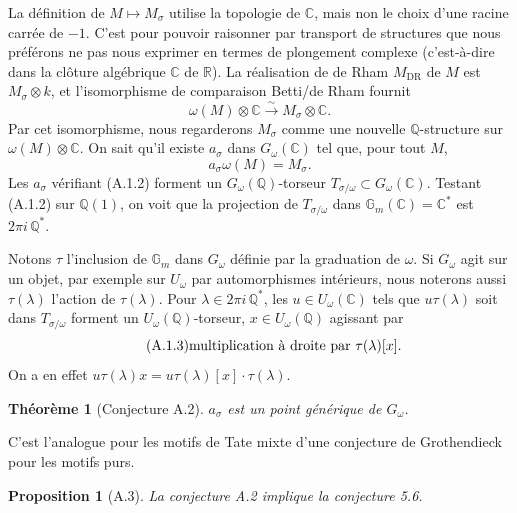 \documentclass[10pt,a4paper]{article}
\newcommand{\Gm}{\mathbb G_m}
\newcommand{\Q}{\mathbb Q}
\newcommand{\C}{\mathbb C}
\newcommand{\R}{\mathbb R}
\theoremstyle{deligne}
\newtheorem*{theorem*}{Théorème}
\newtheorem*{proposition*}{Proposition}
\begin{document}
La définition de \(M\mapsto M_\sigma\) utilise la topologie de \(\C\), mais non le choix d'une racine carrée de \(-1\). C'est pour pouvoir raisonner par transport de structures que nous préférons ne pas nous exprimer en termes de plongement complexe (c'est-à-dire dans la clôture algébrique \(\C\) de \(\R\)). La réalisation de de Rham \(M_{\mathrm{DR}}\) de \(M\) est \(M_\sigma\otimes k\), et l'isomorphisme de comparaison Betti/de Rham fournit
\[
\tag{A.1.1}
\omega(M)\otimes\C\overset{\sim}{\longrightarrow}M_\sigma\otimes\C.
\]
Par cet isomorphisme, nous regarderons \(M_\sigma\) comme une nouvelle \(\Q\)-structure sur \(\omega(M)\otimes\C\). On sait qu'il existe \(a_\sigma\) dans \(G_\omega(\C)\) tel que, pour tout \(M\),
\[
\tag{A.1.2}
a_\sigma\omega(M)=M_\sigma.
\]
Les \(a_\sigma\) vérifiant (A.1.2) forment un \(G_\omega(\Q)\)-torseur \(T_{\sigma/\omega}\subset G_\omega(\C)\). Testant (A.1.2) sur \(\Q(1)\), on voit que la projection de \(T_{\sigma/\omega}\) dans \(\Gm(\C)=\C^*\) est \(2\pi i\,\Q^*\).

Notons \(\tau\) l'inclusion de \(\Gm\) dans \(G_\omega\) définie par la graduation de \(\omega\). Si \(G_\omega\) agit sur un objet, par exemple sur \(U_\omega\) par automorphismes intérieurs, nous noterons aussi \(\tau(\lambda)\) l'action de \(\tau(\lambda)\). Pour \(\lambda\in2\pi i\,\Q^*\), les \(u\in U_\omega(\C)\) tels que \(u\tau(\lambda)\) soit dans \(T_{\sigma/\omega}\) forment un \(U_\omega(\Q)\)-torseur, \(x\in U_\omega(\Q)\) agissant par
\[
\tag{A.1.3}
\hbox{multiplication à droite par }\tau(\lambda)[x].
\]
On a en effet \(u\tau(\lambda)x=u\tau(\lambda)[x]\cdot\tau(\lambda)\).

\begin{theorem*}[Conjecture A.2]
\(a_\sigma\) est un point générique de \(G_\omega\).
\end{theorem*}

C'est l'analogue pour les motifs de Tate mixte d'une conjecture de Grothendieck pour les motifs purs.

\begin{proposition*}[A.3]
La conjecture A.2 implique la conjecture 5.6.
\end{proposition*}
\end{document}
